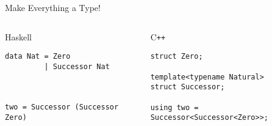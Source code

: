 \documentclass[aspectratio=169]{beamer}
\begin{document}

\begin{frame}[fragile]{Make Everything a Type!}
\begin{columns}[t] 
        \begin{column}{0.5\textwidth}
            \scriptsize
            \begin{block}{Haskell}
                \begin{verbatim}
data Nat = Zero
         | Successor Nat 



two = Successor (Successor Zero)
                \end{verbatim}
            \end{block}
        \end{column}

        \begin{column}{0.5\textwidth}
            \scriptsize
            \begin{block}{C\texttt{++}}
                \begin{verbatim}
struct Zero;

template<typename Natural>
struct Successor;

using two = Successor<Successor<Zero>>;
                \end{verbatim}
            \end{block}
            ~\\~\\~\\~\\~\\~\\~\\~\\~\\~
        \end{column}
\end{columns}
\scriptsize
\end{frame}

\end{document}
